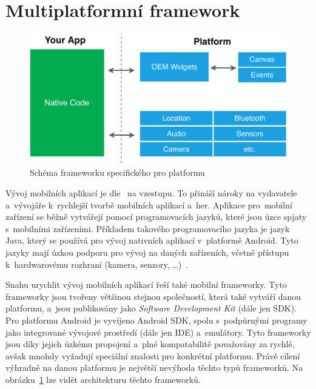 \section{Multiplatformní framework}

\begin{figure}
    \centering
    \includegraphics[width=\linewidth]{assets/technology-research/framework/platform_sdk.pdf}
    \caption{Schéma frameworku specifického pro platformu~\cite{hackernoon_flutter}}
    \label{fig:framework_platform}
\end{figure}

Vývoj mobilních aplikací je dle~\cite{wepc_video_game_statistics} na vzestupu.
To přináší nároky na vydavatele a~vývojáře k~rychlejší tvorbě mobilních
aplikací a~her.
Aplikace pro~mobilní zařízení se běžně vytvářejí pomocí programovacích jazyků,
které jsou úzce spjaty
s~mobilními zařízeními.
Příkladem takového programovacího jazyka je jazyk Java,
který se používá pro vývoj nativních aplikací
v~platformě Android.
Tyto jazyky mají úzkou podporu pro vývoj na daných zařízeních,
včetně přístupu k~hardwarovému rozhraní (kamera, senzory, \dots{})~\cite{dashmagazine_mobile_frameworks}.

Snahu urychlit vývoj mobilních aplikací řeší také mobilní frameworky.
Tyto frameworky jsou tvořeny většinou stejnou společností,
která také vytváří danou platformu,
a~jsou publikovány jako \emph{Software Development Kit} (dále jen SDK).
Pro platformu Android je vyvíjeno Android SDK,
spolu s~podpůrnými programy jako integrované vývojové prostředí
(dále jen IDE) a~emulátory.
Tyto frameworky jsou díky jejich úzkému propojení a~plné kompatabilitě
považovány za rychlé,
avšak mnohdy vyžadují speciální znalosti pro konkrétní platformu.
Právě cílení výhradně na danou platformu je největší nevýhoda těchto typů
frameworků.
Na obrázku~\ref{fig:framework_platform} lze vidět architekturu těchto
frameworků.~\cite{dashmagazine_mobile_frameworks}

